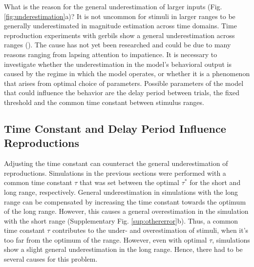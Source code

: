 \documentclass[10pt]{article}
\begin{document}
What is the reason for the general underestimation of larger inputs (Fig. \ref{fig:underestimation}a)? 
It is not uncommon for stimuli in larger ranges to be generally underestimated in magnitude estimation across time domains. Time reproduction experiments with gerbils show a general underestimation across ranges (\cite{Henke2022}). 
The cause has not yet been researched and could be due to many reasons ranging from lapsing attention to impatience. 
It is necessary to investigate whether the underestimation in the model's behavioral output is caused by the regime in which the model operates, or whether it is a phenomenon that arises from optimal choice of parameters.
Possible parameters of the model that could influence the behavior are the delay period between trials, the fixed threshold and the common time constant between stimulus ranges.

\subsection{Time Constant and Delay Period Influence Reproductions}
Adjusting the time constant can counteract the general underestimation of reproductions.
Simulations in the previous sections were performed with a common time constant $\tau$ that was set between the optimal $\tau^*$ for the short and long range, respectively.
General underestimation in simulations with the long range can be compensated by increasing the time constant towards the optimum of the long range. However, this causes a general overestimation in the simulation with the short range (Supplementary Fig. \ref{sup:othererror}b). 
Thus, a common time constant $\tau$ contributes to the under- and overestimation of stimuli, when it's too far from the optimum of the range. However, even with optimal $\tau$, simulations show a slight general underestimation in the long range.
Hence, there had to be several causes for this problem.
\end{document}
